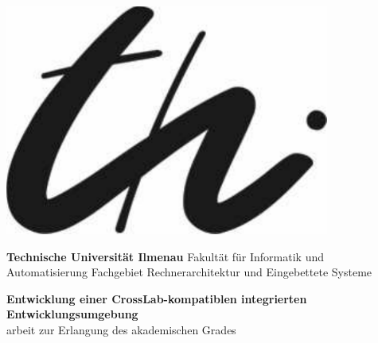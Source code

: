 
\begin{titlepage}
    \hspace{-1cm}
    \begin{minipage}{3.5cm}
        \includegraphics[width=0.8\textwidth]{images/logo}
    \end{minipage}
    \hspace{0.2cm}
    \begin{minipage}{12.5cm}
        \large
        {\bf Technische Universität Ilmenau}\newline
        Fakultät für Informatik und Automatisierung\newline
        Fachgebiet Rechnerarchitektur und Eingebettete Systeme
    \end{minipage}
    \begin{center}
        \vspace{0.8cm}
        {\Large\bfseries Entwicklung einer CrossLab-kompatiblen integrierten Entwicklungsumgebung\\}
        \vspace{0.8cm}
        \settingsDegree arbeit zur Erlangung des akademischen Grades \settingsDegreeName\\[0.5cm]
        {\Large \bfseries \settingsName\\[1.0cm]}
        \begin{table}[ht]
            \centering
            \begin{tabular}{ll}

\end{tabular}
\end{table}
\end{center}
\end{titlepage}

